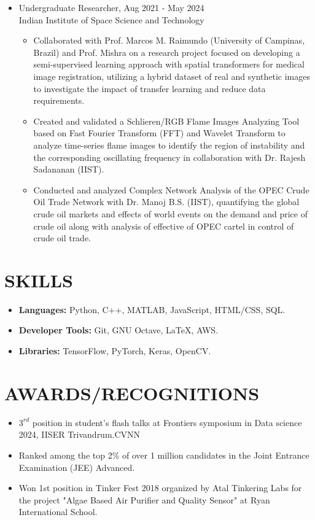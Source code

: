 \documentclass[11pt]{article}
\begin{document}
\begin{itemize}[leftmargin=*,noitemsep,topsep=0pt]
		\item Undergraduate Researcher, \hfill Aug 2021 - May 2024 \\
		Indian Institute of Space Science and Technology
		\begin{itemize}[leftmargin=*,noitemsep,topsep=0pt]
			\item Collaborated with Prof. Marcos M. Raimundo (University of Campinas, Brazil) and Prof. Mishra on a research project focused on developing a semi-supervised learning approach with spatial transformers for medical image registration, utilizing a hybrid dataset of real and synthetic images to investigate the impact of transfer learning and reduce data requirements.	
			\item Created and validated a Schlieren/RGB Flame Images Analyzing Tool based on Fast Fourier Transform (FFT) and Wavelet Transform to analyze time-series flame images to identify the region of instability and the corresponding oscillating frequency in collaboration with Dr. Rajesh
			Sadananan (IIST).
			\item Conducted and analyzed Complex Network Analysis of the OPEC Crude Oil Trade Network with Dr. Manoj B.S. (IIST), quantifying the global crude oil markets and effects of world events on the demand and price of crude oil along with analysis of effective of OPEC cartel in control of crude oil trade.
		\end{itemize}
		\end{itemize}
	
	\section*{\bf SKILLS}
	\begin{itemize}[leftmargin=*,noitemsep,topsep=0pt]
		\item \textbf{Languages:} Python, C++, MATLAB, JavaScript, HTML/CSS, SQL.
		\item \textbf{Developer Tools:} Git, GNU Octave, LaTeX, AWS.
		\item \textbf{Libraries:} TensorFlow, PyTorch, Keras, OpenCV.
	\end{itemize}
	
	\section*{\bf AWARDS/RECOGNITIONS}
	\begin{itemize}[leftmargin=*,noitemsep,topsep=0pt]
		\item $3^{rd}$ position in student's flash talks at Frontiers symposium in Data science 2024, IISER Trivandrum.CVNN
		\item Ranked among the top 2\% of over 1 million candidates in the Joint Entrance Examination (JEE) Advanced.
		\item Won 1st position in Tinker Fest 2018 organized by Atal Tinkering Labs for the project "Algae Based Air Purifier and Quality Sensor" at Ryan International School.
	\end{itemize}
	
\end{document}
